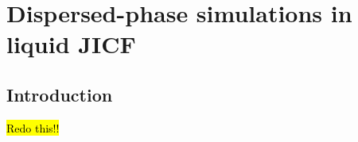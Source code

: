 \chapter{Dispersed-phase simulations in liquid JICF}
	\label{ch6:jicf_lgs_simulations}


%
%
%	
%	
%	
%	
%


\section{Introduction}

\hl{Redo this!!}


